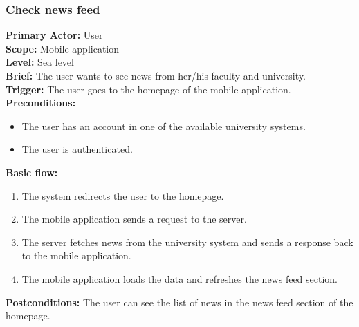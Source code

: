 \subsubsection{\large{Check news feed}}
\textbf{Primary Actor:} User\\
\textbf{Scope:} Mobile application\\
\textbf{Level:} Sea level\\
\textbf{Brief:} The user wants to see news from her/his faculty and university.\\
\textbf{Trigger:} The user goes to the homepage of the mobile application.\\
\textbf{Preconditions:}
\begin{itemize}
    \item The user has an account in one of the available university systems.
    \item The user is authenticated.
\end{itemize}
\textbf{Basic flow:}
\begin{enumerate}
    \item The system redirects the user to the homepage.
    \item The mobile application sends a request to the server.
    \item The server fetches news from the university system and sends a response back to the mobile application.
    \item The mobile application loads the data and refreshes the news feed section.
\end{enumerate}
\textbf{Postconditions:}
The user can see the list of news in the news feed section of the homepage.


